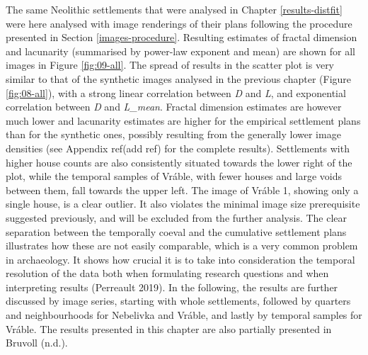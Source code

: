 \documentclass[
  12pt,
  a4paper, twoside]{book}
\begin{document}
The same Neolithic settlements that were analysed in Chapter \ref{results-distfit} were here analysed with image renderings of their plans following the procedure presented in Section \ref{images-procedure}. Resulting estimates of fractal dimension and lacunarity (summarised by power-law exponent and mean) are shown for all images in Figure \ref{fig:09-all}. The spread of results in the scatter plot is very similar to that of the synthetic images analysed in the previous chapter (Figure \ref{fig:08-all}), with a strong linear correlation between \emph{D} and \emph{L}, and exponential correlation between \emph{D} and \emph{L\_mean}. Fractal dimension estimates are however much lower and lacunarity estimates are higher for the empirical settlement plans than for the synthetic ones, possibly resulting from the generally lower image densities (see Appendix ref(add ref) for the complete results). Settlements with higher house counts are also consistently situated towards the lower right of the plot, while the temporal samples of Vráble, with fewer houses and large voids between them, fall towards the upper left. The image of Vráble 1, showing only a single house, is a clear outlier. It also violates the minimal image size prerequisite suggested previously, and will be excluded from the further analysis. The clear separation between the temporally coeval and the cumulative settlement plans illustrates how these are not easily comparable, which is a very common problem in archaeology. It shows how crucial it is to take into consideration the temporal resolution of the data both when formulating research questions and when interpreting results (Perreault 2019). In the following, the results are further discussed by image series, starting with whole settlements, followed by quarters and neighbourhoods for Nebelivka and Vráble, and lastly by temporal samples for Vráble. The results presented in this chapter are also partially presented in Bruvoll (n.d.).
\end{document}
